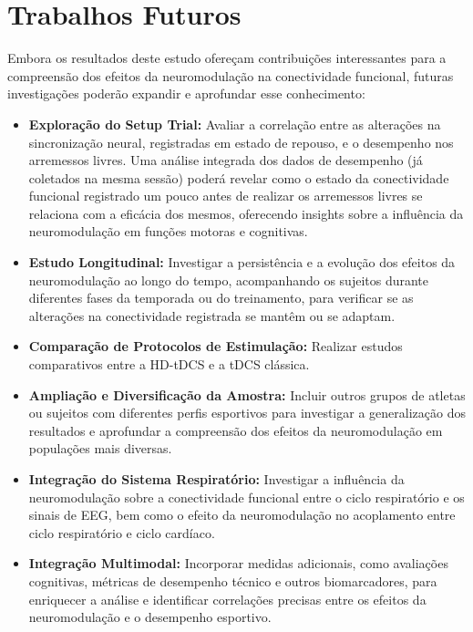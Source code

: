 \section{Trabalhos Futuros}
Embora os resultados deste estudo ofereçam contribuições interessantes para a compreensão dos efeitos da neuromodulação na conectividade funcional, futuras investigações poderão expandir e aprofundar esse conhecimento:
\begin{itemize}
    \item \textbf{Exploração do Setup Trial:} Avaliar a correlação entre as alterações na sincronização neural, registradas em estado de repouso, e o desempenho nos arremessos livres. Uma análise integrada dos dados de desempenho (já coletados na mesma sessão) poderá revelar como o estado da conectividade funcional registrado um pouco antes de realizar os arremessos livres se relaciona com a eficácia dos mesmos, oferecendo insights sobre a influência da neuromodulação em funções motoras e cognitivas.
    
    \item \textbf{Estudo Longitudinal:} Investigar a persistência e a evolução dos efeitos da neuromodulação ao longo do tempo, acompanhando os sujeitos durante diferentes fases da temporada ou do treinamento, para verificar se as alterações na conectividade registrada se mantêm ou se adaptam.
    
    \item \textbf{Comparação de Protocolos de Estimulação:} Realizar estudos comparativos entre a HD-tDCS e a tDCS clássica.
    
    \item \textbf{Ampliação e Diversificação da Amostra:} Incluir outros grupos de atletas ou sujeitos com diferentes perfis esportivos para investigar a generalização dos resultados e aprofundar a compreensão dos efeitos da neuromodulação em populações mais diversas.

    \item \textbf{Integração do Sistema Respiratório:} Investigar a influência da neuromodulação sobre a conectividade funcional entre o ciclo respiratório e os sinais de EEG, bem como o efeito da neuromodulação no acoplamento entre ciclo respiratório e ciclo cardíaco.

    \item \textbf{Integração Multimodal:} Incorporar medidas adicionais, como avaliações cognitivas, métricas de desempenho técnico e outros biomarcadores, para enriquecer a análise e identificar correlações precisas entre os efeitos da neuromodulação e o desempenho esportivo.
\end{itemize}

